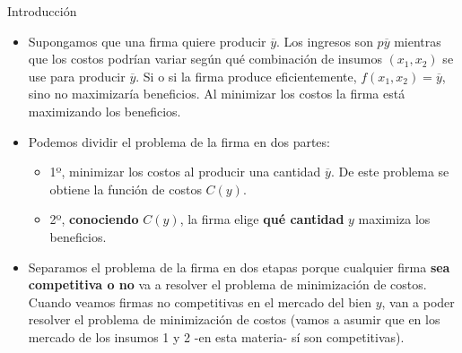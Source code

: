\documentclass{beamer}
\theoremstyle{definition}
\begin{document}
\begin{frame}{Introducci\'on}
\begin{itemize}\small
\item Supongamos que una firma quiere producir $\overline{y}$. Los ingresos son $p \overline{y}$ mientras que los costos podrían variar según qué combinación de insumos $(x_1,x_2)$ se use para producir $\overline{y}$. Si o si la firma produce eficientemente, $f(x_1,x_2)=\overline{y}$, sino no maximizaría beneficios. Al minimizar los costos la firma está maximizando los beneficios.
\item Podemos dividir el problema de la firma en dos partes:
\begin{itemize}
\item 1º, minimizar los costos al producir una cantidad $\overline{y}$. De este problema se obtiene la función de costos $C(y)$. %
\item 2º, \textbf{conociendo} $C(y)$, la firma elige \textbf{qué cantidad} $y$ maximiza los beneficios.
\end{itemize}

		\item Separamos el problema de la firma en dos etapas porque cualquier firma \textbf{sea competitiva o no} va a resolver el problema de minimización de costos. Cuando veamos firmas no competitivas en el mercado del bien $y$, van a poder resolver el problema de minimización de costos (vamos a asumir que en los mercado de los insumos 1 y 2 -en esta materia- sí son competitivas).
  
		

\end{itemize}
\end{frame}
\end{document}
